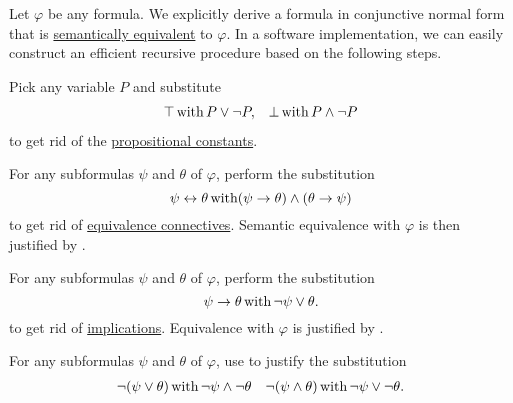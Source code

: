 \begin{algorithm}\label{alg:conjunctive_normal_form_reduction}
  Let \( \varphi \) be any formula. We explicitly derive a formula in conjunctive normal form that is \hyperref[def:propositional_semantics/equivalence]{semantically equivalent} to \( \varphi \). In a software implementation, we can easily construct an efficient recursive procedure based on the following steps.

  \begin{thmenum}
     Pick any variable \( P \) and substitute
    \begin{align*}
      \top \mathop{\text{with}} P \vee \neg P, && \bot \mathop{\text{with}} P \wedge \neg P
    \end{align*}
    to get rid of the \hyperref[def:propositional_language/constants]{propositional constants}.

     For any subformulas \( \psi \) and \( \theta \) of \( \varphi \), perform the substitution
    \begin{equation*}
      \psi \leftrightarrow \theta \mathop{\text{with}} (\psi \to \theta) \wedge (\theta \to \psi)
    \end{equation*}
    to get rid of \hyperref[def:propositional_language/connectives/equivalence]{equivalence connectives}. Semantic equivalence with \( \varphi \) is then justified by .

     For any subformulas \( \psi \) and \( \theta \) of \( \varphi \), perform the substitution
    \begin{equation*}
      \psi \to \theta \mathop{\text{with}} \neg \psi \vee \theta.
    \end{equation*}
    to get rid of \hyperref[def:propositional_language/connectives/implication]{implications}. Equivalence with \( \varphi \) is justified by .

     For any subformulas \( \psi \) and \( \theta \) of \( \varphi \), use  to justify the substitution
    \begin{align*}
      \neg(\psi \vee \theta) \mathop{\text{with}} \neg \psi \wedge \neg \theta
      &&
      \neg(\psi \wedge \theta) \mathop{\text{with}} \neg \psi \vee \neg \theta.
    \end{align*}


\end{thmenum}
\end{algorithm}
